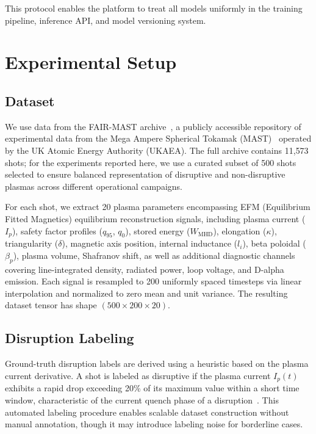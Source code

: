 \documentclass[twocolumn]{article}
\begin{document}
This protocol enables the platform to treat all models
uniformly in the training pipeline, inference API, and
model versioning system.


\section{Experimental Setup}
\label{sec:experiments}

\subsection{Dataset}

We use data from the FAIR-MAST archive~\citep{fairmast},
a publicly accessible repository of experimental data from
the Mega Ampere Spherical Tokamak
(MAST)~\citep{sykes2001, harrison2019} operated by the
UK Atomic Energy Authority (UKAEA).
The full archive contains 11{,}573 shots; for the experiments
reported here, we use a curated subset of 500 shots selected
to ensure balanced representation of disruptive and
non-disruptive plasmas across different operational campaigns.

For each shot, we extract 20 plasma parameters encompassing
EFM (Equilibrium Fitted Magnetics) equilibrium
reconstruction signals, including plasma current ($I_p$),
safety factor profiles ($q_{95}$, $q_0$), stored energy
($W_{\text{MHD}}$), elongation ($\kappa$), triangularity
($\delta$), magnetic axis position, internal inductance
($l_i$), beta poloidal ($\beta_p$), plasma volume,
Shafranov shift, as well as additional diagnostic channels
covering line-integrated density, radiated power,
loop voltage, and D-alpha emission.
Each signal is resampled to 200 uniformly spaced timesteps
via linear interpolation and normalized to zero mean and
unit variance.
The resulting dataset tensor has shape
$(500 \times 200 \times 20)$.

\subsection{Disruption Labeling}

Ground-truth disruption labels are derived using a heuristic
based on the plasma current derivative.
A shot is labeled as disruptive if the plasma current
$I_p(t)$ exhibits a rapid drop exceeding 20\% of its
maximum value within a short time window,
characteristic of the current quench phase of a
disruption~\citep{schuller1995, boozer2012}.
This automated labeling procedure enables scalable dataset
construction without manual annotation, though it may
introduce labeling noise for borderline cases.
\end{document}
